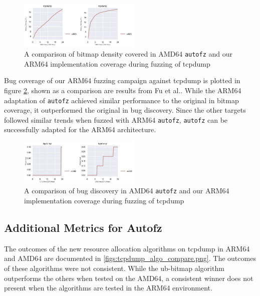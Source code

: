 \begin{figure}
    \includegraphics[width=0.52\textwidth]{figs/tcpdump_compare_orig_arm64.png}
    \centering
    \caption{A comparison of bitmap density covered in AMD64 \texttt{autofz} and our ARM64 implementation
    coverage during fuzzing of tcpdump}
    \label{fig:tcpdump_compare_orig_arm64}
\end{figure}

Bug coverage of our ARM64 fuzzing campaign against tcpdump is plotted in figure \ref{figs:tcp_compare_orig_arm64_ub.png}, 
shown as a comparison are results from Fu et al.\cite{fu_autofz_2023}. While the ARM64 adaptation of 
\texttt{autofz} achieved similar performance to the original in bitmap coverage, it outperformed the 
original in bug discovery. Since the other targets followed similar trends when fuzzed with ARM64 
\texttt{autofz}, \texttt{autofz} can be successfully adapted for the ARM64 architecture.

\begin{figure}
    \includegraphics[width=0.52\textwidth]{figs/tcpdump_compare_orig_arm64_ub.png}
    \centering
    \caption{A comparison of bug discovery in AMD64 \texttt{autofz} and our ARM64 implementation
    coverage during fuzzing of tcpdump}
    \label{figs:tcp_compare_orig_arm64_ub.png}
\end{figure}

\subsection{Additional Metrics for Autofz}

The outcomes of the new resource allocation algorithms on tcpdump in ARM64 and AMD64 are documented in 
\ref{figs:tcpdump_algo_compare.png}. The outcomes of these algorithms were not consistent. While the 
ub-bitmap algorithm outperforms the others when tested on the AMD64, a consistent winner does not 
present when the algorithms are tested in the ARM64 environment.


